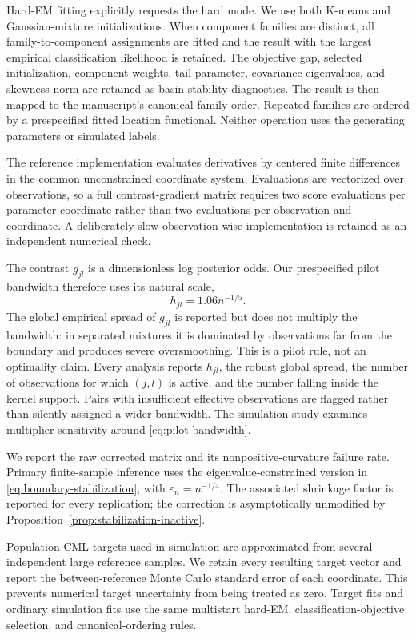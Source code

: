 Hard-EM fitting explicitly requests the hard mode.  We use both K-means and
Gaussian-mixture initializations.  When component families are distinct, all
family-to-component assignments are fitted and the result with the largest
empirical classification likelihood is retained.  The objective gap, selected
initialization, component weights, tail parameter, covariance eigenvalues, and
skewness norm are retained as basin-stability diagnostics.  The result is then
mapped to the manuscript's canonical family order.  Repeated families are
ordered by a prespecified fitted location functional.  Neither operation uses
the generating parameters or simulated labels.

The reference implementation evaluates derivatives by centered finite
differences in the common unconstrained coordinate system.  Evaluations are
vectorized over observations, so a full contrast-gradient matrix requires
two score evaluations per parameter coordinate rather than two evaluations
per observation and coordinate.  A deliberately slow observation-wise
implementation is retained as an independent numerical check.

The contrast $g_{jl}$ is a dimensionless log posterior odds.  Our prespecified
pilot bandwidth therefore uses its natural scale,
\begin{equation}
 h_{jl}=1.06n^{-1/5}.
 \label{eq:pilot-bandwidth}
\end{equation}
The global empirical spread of $g_{jl}$ is reported but does not multiply the
bandwidth: in separated mixtures it is dominated by observations far from the
boundary and produces severe oversmoothing. This is a pilot rule, not an
optimality claim. Every analysis reports $h_{jl}$, the robust global spread,
the number of observations for which $(j,l)$ is active, and the number falling
inside the kernel support.
Pairs with insufficient effective observations are flagged rather than
silently assigned a wider bandwidth.  The simulation study examines
multiplier sensitivity around \eqref{eq:pilot-bandwidth}.

We report the raw corrected matrix and its nonpositive-curvature failure rate.
Primary finite-sample inference uses the eigenvalue-constrained version in
\eqref{eq:boundary-stabilization}, with $\varepsilon_n=n^{-1/4}$.  The
associated shrinkage factor is reported for every replication; the correction
is asymptotically unmodified by Proposition~\ref{prop:stabilization-inactive}.

Population CML targets used in simulation are approximated from several
independent large reference samples.  We retain every resulting target vector
and report the between-reference Monte Carlo standard error of each coordinate.
This prevents numerical target uncertainty from being treated as zero.  Target
fits and ordinary simulation fits use the same multistart hard-EM,
classification-objective selection, and canonical-ordering rules.

